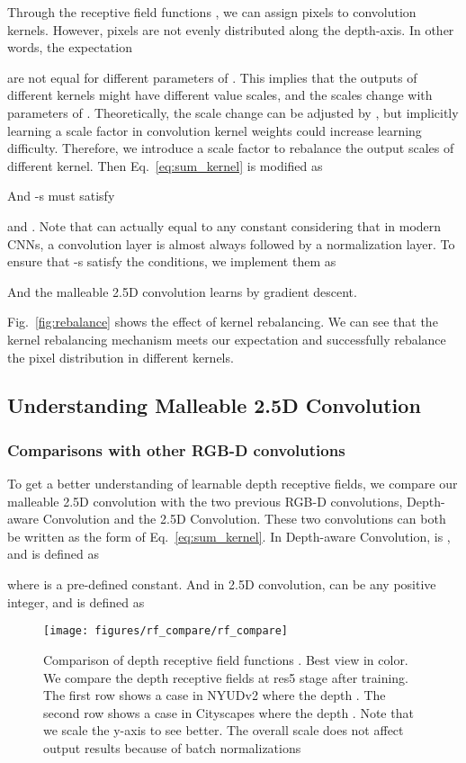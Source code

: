 \documentclass[runningheads]{llncs}
\begin{document}
Through the receptive field functions , we can assign pixels to convolution kernels.
However, pixels are not evenly distributed along the depth-axis.
In other words, the expectation
 
are not equal for different parameters of .
This implies that the outputs of different kernels might have different value scales, and the scales change with parameters of .
Theoretically, the scale change can be adjusted by , but implicitly learning a scale factor in convolution kernel weights could increase learning difficulty.
Therefore, we introduce a scale factor  to rebalance the output scales of different kernel.
Then Eq.~\ref{eq:sum_kernel} is modified as

And -s must satisfy

and
.
Note that  can actually equal to any constant considering that in modern CNNs, a convolution layer is almost always followed by a normalization layer.
To ensure that -s satisfy the conditions, we implement them as

And the malleable 2.5D convolution learns  by gradient descent.

Fig.~\ref{fig:rebalance} shows the effect of kernel rebalancing.
We can see that the kernel rebalancing mechanism meets our expectation and successfully rebalance the pixel distribution in different kernels.

\subsection{Understanding Malleable 2.5D Convolution}
\subsubsection{Comparisons with other RGB-D convolutions}
To get a better understanding of learnable depth receptive fields, we compare our malleable 2.5D convolution with the two previous RGB-D convolutions, Depth-aware Convolution and the 2.5D Convolution.
These two convolutions can both be written as the form of Eq.~\ref{eq:sum_kernel}.
In Depth-aware Convolution,  is , and  is defined as

where  is a pre-defined constant.
And in 2.5D convolution,  can be any positive integer, and  is defined as


\begin{figure}[htbp]
  \centering
  \texttt{[image: figures/rf\_compare/rf\_compare]}
  \caption{
  Comparison of depth receptive field functions .
  Best view in color.
  We compare the depth receptive fields at res5 stage after training.
  The first row shows a case in NYUDv2 where the depth .
  The second row shows a case in Cityscapes where the depth .
  Note that we scale the y-axis to see better.
  The overall scale does not affect output results because of batch normalizations
  }
  \label{fig:receptive_field_compare}
\end{figure}
\end{document}
